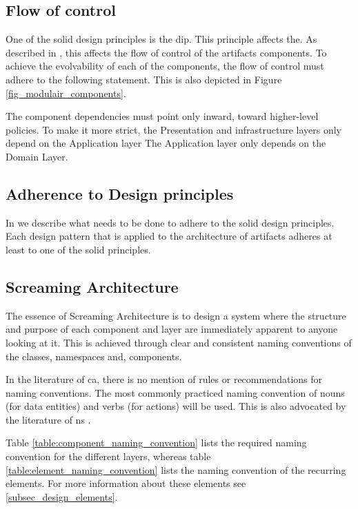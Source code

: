 \subsection{Flow of control}
One of the \gls{solid} design principles is the \acrfull{dip}. This principle affects the.
As described in , this affects the flow of control of the
artifacts components. To achieve the evolvability of each of the components, the flow of
control must adhere to the following statement. This is also depicted in Figure
\ref{fig_modulair_components}.

The component dependencies must point only inward, toward higher-level policies. To make
it more strict, the Presentation and infrastructure layers only depend on the Application
layer The Application layer only depends on the  Domain Layer.

\subsection{Adherence to Design principles}
In  we describe what needs to be done to adhere to the
\gls{solid} design principles. Each design pattern that is applied to the architecture of
artifacts adheres at least to one of the \gls{solid} principles.

\subsection{Screaming Architecture}
The essence of Screaming Architecture is to design a system where the structure and
purpose of each component and layer are immediately apparent to anyone looking at it. This
is achieved through clear and consistent naming conventions of the classes, namespaces and,
components.

In the literature of \gls{ca}, there is no mention of rules or recommendations for naming
conventions. The most commonly practiced naming convention of nouns (for data entities)
and verbs (for actions) will be used. This is also advocated by the literature of \gls{ns}
\parencite[357]{mannaert_normalized_2016}.

Table \ref{table:component_naming_convention} lists the required naming convention for the
different layers, whereas table \ref{table:element_naming_convention} lists the naming
convention of the recurring elements. For more information about these elements see
\ref{subsec_design_elements}.

